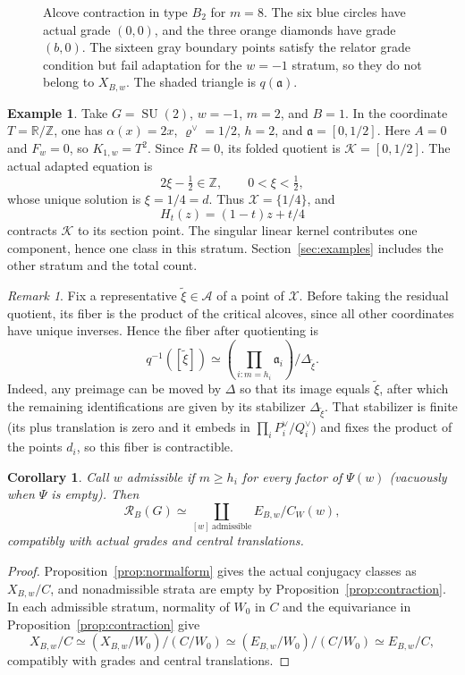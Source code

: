 \documentclass[11pt,a4paper,reqno]{amsart}
\theoremstyle{plain}
\newtheorem{corollary}[theorem]{Corollary}
\theoremstyle{definition}
\newtheorem{example}[theorem]{Example}
\theoremstyle{remark}
\newtheorem{remark}[theorem]{Remark}
\numberwithin{equation}{section}
\newcommand{\SU}{\operatorname{SU}}
\newcommand{\ZZ}{\mathbb Z}
\newcommand{\RR}{\mathbb R}
\newcommand{\fa}{\mathfrak a}
\newcommand{\cR}{\mathcal R}
\newcommand{\rh}{\varrho^\vee}
\begin{document}
\begin{figure}[htbp]
\centering

\caption{Alcove contraction in type $B_2$ for $m=8$. The six blue circles have actual grade $(0,0)$, and the three orange diamonds have grade $(b,0)$. The sixteen gray boundary points satisfy the relator grade condition but fail adaptation for the $w=-1$ stratum, so they do not belong to $X_{B,w}$. The shaded triangle is $q(\fa)$.}
\label{fig:b2-contraction}
\end{figure}

\begin{example}\label{ex:criticalcontraction} Take $G=\SU(2)$, $w=-1$, $m=2$, and $B=1$. In the coordinate $T=\RR/\ZZ$, one has $\alpha(x)=2x$, $\rh=1/2$, $h=2$, and $\fa=[0,1/2]$. Here $A=0$ and $F_w=0$, so $K_{1,w}=T^2$. Since $R=0$, its folded quotient is $\mathcal K=[0,1/2]$. The actual adapted equation is
\[
2\xi-\tfrac12\in\ZZ,\qquad 0<\xi<\tfrac12,
\]
whose unique solution is $\xi=1/4=d$. Thus $\mathcal X=\{1/4\}$, and
\[
H_t(z)=(1-t)z+t/4
\]
contracts $\mathcal K$ to its section point. The singular linear kernel contributes one component, hence one class in this stratum. Section~\ref{sec:examples} includes the other stratum and the total count.
\end{example}

\begin{remark} Fix a representative $\widetilde\xi\in\mathcal A$ of a point of $\mathcal X$. Before taking the residual quotient, its fiber is the product of the critical alcoves, since all other coordinates have unique inverses. Hence the fiber after quotienting is
\[
q^{-1}([\widetilde\xi])\simeq \left(\prod_{i:m=h_i}\fa_i\right)/\Delta_{\widetilde\xi}.
\]
Indeed, any preimage can be moved by $\Delta$ so that its image equals $\widetilde\xi$, after which the remaining identifications are given by its stabilizer $\Delta_{\widetilde\xi}$. That stabilizer is finite (its plus translation is zero and it embeds in $\prod_i P_i^\vee/Q_i^\vee$) and fixes the product of the points $d_i$, so this fiber is contractible.
\end{remark}

\begin{corollary}\label{cor:model} Call $w$ \emph{admissible} if $m\ge h_i$ for every factor of $\Psi(w)$ (vacuously when $\Psi$ is empty). Then
\begin{equation}\label{eq:classmodel}
\cR_B(G)\simeq\coprod_{[w]\ \mathrm{admissible}} E_{B,w}/C_W(w),
\end{equation}
compatibly with actual grades and central translations.
\end{corollary}
\begin{proof}
Proposition~\ref{prop:normalform} gives the actual conjugacy classes as $X_{B,w}/C$, and nonadmissible strata are empty by Proposition~\ref{prop:contraction}. In each admissible stratum, normality of $W_0$ in $C$ and the equivariance in Proposition~\ref{prop:contraction} give
\[
X_{B,w}/C \simeq (X_{B,w}/W_0)/(C/W_0) \simeq (E_{B,w}/W_0)/(C/W_0) \simeq E_{B,w}/C,
\]
compatibly with grades and central translations.
\end{proof}
\end{document}
